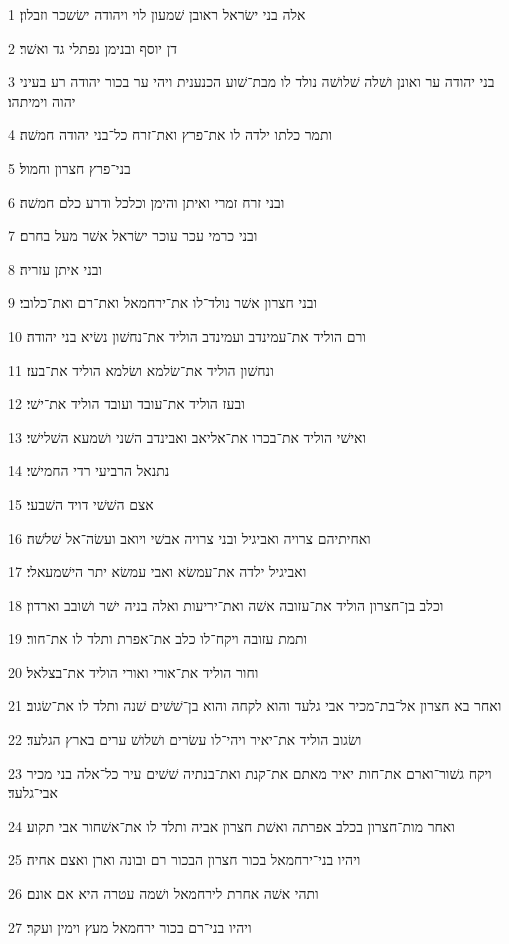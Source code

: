 \par 1 אלה בני ישׂראל ראובן שׁמעון לוי ויהודה ישׂשכר וזבלון׃
\par 2 דן יוסף ובנימן נפתלי גד ואשׁר׃
\par 3 בני יהודה ער ואונן ושׁלה שׁלושׁה נולד לו מבת־שׁוע הכנענית ויהי ער בכור יהודה רע בעיני יהוה וימיתהו׃
\par 4 ותמר כלתו ילדה לו את־פרץ ואת־זרח כל־בני יהודה חמשׁה׃
\par 5 בני־פרץ חצרון וחמול׃
\par 6 ובני זרח זמרי ואיתן והימן וכלכל ודרע כלם חמשׁה׃
\par 7 ובני כרמי עכר עוכר ישׂראל אשׁר מעל בחרם׃
\par 8 ובני איתן עזריה׃
\par 9 ובני חצרון אשׁר נולד־לו את־ירחמאל ואת־רם ואת־כלובי׃
\par 10 ורם הוליד את־עמינדב ועמינדב הוליד את־נחשׁון נשׂיא בני יהודה׃
\par 11 ונחשׁון הוליד את־שׂלמא ושׂלמא הוליד את־בעז׃
\par 12 ובעז הוליד את־עובד ועובד הוליד את־ישׁי׃
\par 13 ואישׁי הוליד את־בכרו את־אליאב ואבינדב השׁני ושׁמעא השׁלישׁי׃
\par 14 נתנאל הרביעי רדי החמישׁי׃
\par 15 אצם השׁשׁי דויד השׁבעי׃
\par 16 ואחיתיהם צרויה ואביגיל ובני צרויה אבשׁי ויואב ועשׂה־אל שׁלשׁה׃
\par 17 ואביגיל ילדה את־עמשׂא ואבי עמשׂא יתר הישׁמעאלי׃
\par 18 וכלב בן־חצרון הוליד את־עזובה אשׁה ואת־יריעות ואלה בניה ישׁר ושׁובב וארדון׃
\par 19 ותמת עזובה ויקח־לו כלב את־אפרת ותלד לו את־חור׃
\par 20 וחור הוליד את־אורי ואורי הוליד את־בצלאל׃
\par 21 ואחר בא חצרון אל־בת־מכיר אבי גלעד והוא לקחה והוא בן־שׁשׁים שׁנה ותלד לו את־שׂגוב׃
\par 22 ושׂגוב הוליד את־יאיר ויהי־לו עשׂרים ושׁלושׁ ערים בארץ הגלעד׃
\par 23 ויקח גשׁור־וארם את־חות יאיר מאתם את־קנת ואת־בנתיה שׁשׁים עיר כל־אלה בני מכיר אבי־גלעד׃
\par 24 ואחר מות־חצרון בכלב אפרתה ואשׁת חצרון אביה ותלד לו את־אשׁחור אבי תקוע׃
\par 25 ויהיו בני־ירחמאל בכור חצרון הבכור רם ובונה וארן ואצם אחיה׃
\par 26 ותהי אשׁה אחרת לירחמאל ושׁמה עטרה היא אם אונם׃
\par 27 ויהיו בני־רם בכור ירחמאל מעץ וימין ועקר׃
